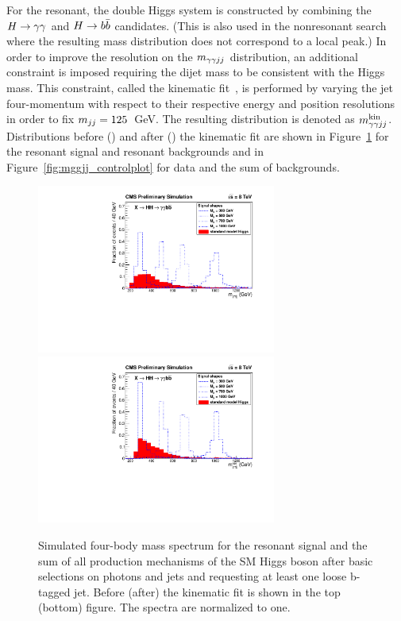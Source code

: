 For the resonant, the double Higgs system is constructed
by combining the $H\to\gamma\gamma$ and $H\to b\bar{b}$ candidates. (This is also used in the nonresonant search
where the resulting mass distribution does not correspond to a local peak.)
In order to improve the resolution on the $m_{\gamma\gamma jj}$ distribution, an additional constraint is imposed
requiring the dijet mass to be consistent with the Higgs mass. This constraint, called the
kinematic fit~\cite{Chatrchyan:2013yoa}, is performed by varying the jet four-momentum
with respect to their
respective energy and position resolutions in order to fix $m_{jj} = 125$~GeV.
The resulting distribution is denoted as $m_{\gamma\gamma jj}^{\rm kin}$. Distributions before (\Mggjj) and after (\Mggjjk)
the kinematic fit
are shown in Figure~\ref{fig:mggjj_onlyhiggs} for the resonant signal and resonant backgrounds
and in Figure~\ref{fig:mggjj_controlplot} for data and the sum of backgrounds.

\begin{figure}[ht]
 \begin{center}
   \includegraphics[width=0.70\textwidth]{figures/selection/TotalMass_OnlyHiggs.pdf}
   \includegraphics[width=0.70\textwidth]{figures/selection/TotalMassKinFit_OnlyHiggs.pdf}
 \end{center}
\caption{Simulated four-body mass spectrum for the resonant signal and the sum of all production
mechanisms of the
SM Higgs boson after basic selections on photons and jets and requesting at least
one loose b-tagged jet. Before (after) the kinematic fit is shown in the top (bottom) figure.
The spectra are normalized to one.}
\label{fig:mggjj_onlyhiggs}
\end{figure}

